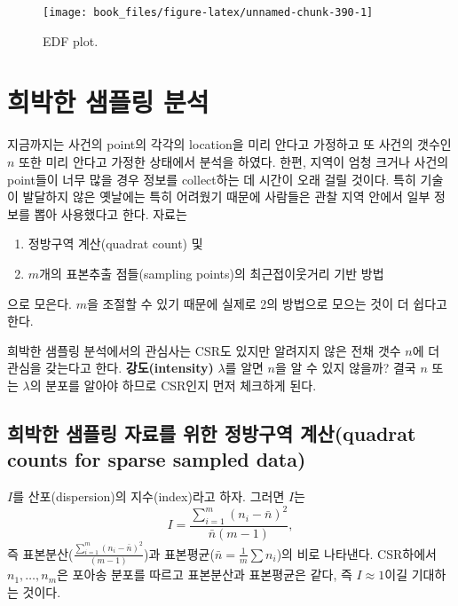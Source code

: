 \documentclass[b5paper,]{scrbook}
\theoremstyle{plain}
\theoremstyle{definition}
\numberwithin{equation}{section}
\begin{document}
\begin{figure}

{\centering \texttt{[image: book\_files/figure-latex/unnamed-chunk-390-1]} 

}

\caption{EDF plot.}\label{fig:unnamed-chunk-390}
\end{figure}

\hypertarget{sparsesampling}{%
\chapter{희박한 샘플링 분석}\label{sparsesampling}}

지금까지는 사건의 point의 각각의 location을 미리 안다고 가정하고 또 사건의 갯수인 \(n\) 또한 미리 안다고 가정한 상태에서 분석을 하였다. 한편, 지역이 엄청 크거나 사건의 point들이 너무 많을 경우 정보를 collect하는 데 시간이 오래 걸릴 것이다. 특히 기술이 발달하지 않은 옛날에는 특히 어려웠기 때문에 사람들은 관찰 지역 안에서 일부 정보를 뽑아 사용했다고 한다. 자료는

\begin{enumerate}
\def\labelenumi{\arabic{enumi}.}
\item
  정방구역 계산(quadrat count) 및
\item
  \(m\)개의 표본추출 점들(sampling points)의 최근접이웃거리 기반 방법
\end{enumerate}

으로 모은다. \(m\)을 조절할 수 있기 때문에 실제로 2의 방법으로 모으는 것이 더 쉽다고 한다.

희박한 샘플링 분석에서의 관심사는 CSR도 있지만 알려지지 않은 전채 갯수 \(n\)에 더 관심을 갖는다고 한다. \textbf{강도(intensity)} \(\lambda\)를 알면 \(n\)을 알 수 있지 않을까? 결국 \(n\) 또는 \(\lambda\)의 분포를 알아야 하므로 CSR인지 먼저 체크하게 된다.

\hypertarget{-----quadrat-counts-for-sparse-sampled-data}{%
\section{희박한 샘플링 자료를 위한 정방구역 계산(quadrat counts for sparse sampled data)}\label{-----quadrat-counts-for-sparse-sampled-data}}

\(I\)를 산포(dispersion)의 지수(index)라고 하자. 그러면 \(I\)는
\[I=\frac{\sum_{i=1}^{m}(n_{i}-\bar{n})^{2}}{\bar{n}(m-1)},\]
즉 표본분산(\(\frac{\sum_{i=1}^{m}(n_{i}-\bar{n})^{2}}{(m-1)}\))과 표본평균(\(\bar{n}=\frac{1}{m}\sum n_{i}\))의 비로 나타낸다. CSR하에서 \(n_{1}, \ldots, n_{m}\)은 포아송 분포를 따르고 표본분산과 표본평균은 같다, 즉 \(I \approx 1\)이길 기대하는 것이다.
\end{document}
